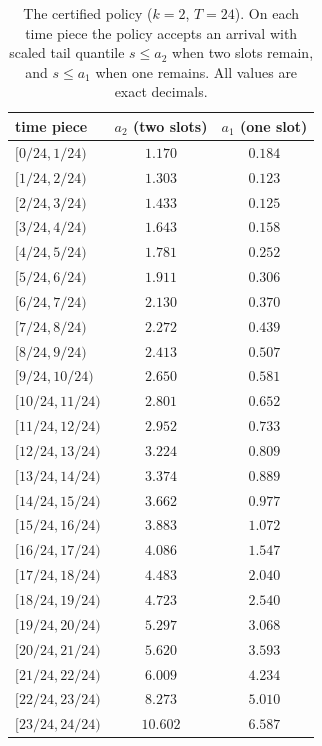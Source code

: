 \documentclass[11pt]{article}
\theoremstyle{remark}
\begin{document}
\begin{longtable}{lcc}
\caption{The certified policy ($k=2$, $T=24$). On each time piece the policy accepts an arrival with scaled tail quantile $s\le a_2$ when two slots remain, and $s\le a_1$ when one remains. All values are exact decimals.}\label{tab:policy}\\
\toprule time piece & $a_2$ (two slots) & $a_1$ (one slot)\\\midrule
$[0/24,1/24)$ & $1.170$ & $0.184$ \\
$[1/24,2/24)$ & $1.303$ & $0.123$ \\
$[2/24,3/24)$ & $1.433$ & $0.125$ \\
$[3/24,4/24)$ & $1.643$ & $0.158$ \\
$[4/24,5/24)$ & $1.781$ & $0.252$ \\
$[5/24,6/24)$ & $1.911$ & $0.306$ \\
$[6/24,7/24)$ & $2.130$ & $0.370$ \\
$[7/24,8/24)$ & $2.272$ & $0.439$ \\
$[8/24,9/24)$ & $2.413$ & $0.507$ \\
$[9/24,10/24)$ & $2.650$ & $0.581$ \\
$[10/24,11/24)$ & $2.801$ & $0.652$ \\
$[11/24,12/24)$ & $2.952$ & $0.733$ \\
$[12/24,13/24)$ & $3.224$ & $0.809$ \\
$[13/24,14/24)$ & $3.374$ & $0.889$ \\
$[14/24,15/24)$ & $3.662$ & $0.977$ \\
$[15/24,16/24)$ & $3.883$ & $1.072$ \\
$[16/24,17/24)$ & $4.086$ & $1.547$ \\
$[17/24,18/24)$ & $4.483$ & $2.040$ \\
$[18/24,19/24)$ & $4.723$ & $2.540$ \\
$[19/24,20/24)$ & $5.297$ & $3.068$ \\
$[20/24,21/24)$ & $5.620$ & $3.593$ \\
$[21/24,22/24)$ & $6.009$ & $4.234$ \\
$[22/24,23/24)$ & $8.273$ & $5.010$ \\
$[23/24,24/24)$ & $10.602$ & $6.587$ \\
\bottomrule
\end{longtable}
\end{document}
